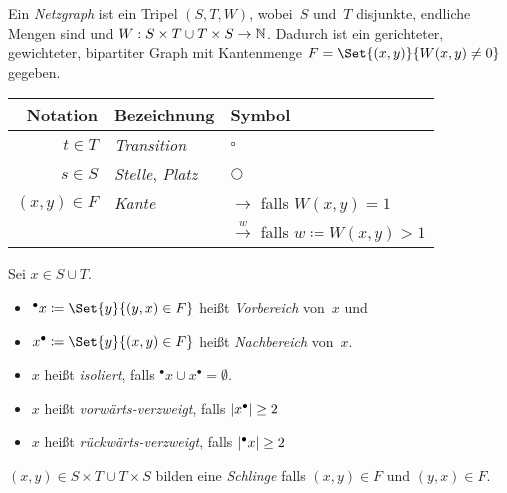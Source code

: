 \documentclass{cheat-sheet}
\newcommand{\transition}{\square} %
\newcommand{\place}{\bigcirc} %
\newcommand{\preset}[1]{{}^\bullet{#1}} %
\newcommand{\postset}[1]{{#1}^\bullet} %
\begin{document}
\raggedcolumns %



\begin{defn}
  Ein \emph{Netzgraph} ist ein Tripel $(S, T, W)$, wobei~$S$ und~$T$ disjunkte, endliche Mengen sind und $W : S \times T \cup T \times S \to \mathbb{N}$.
  Dadurch ist ein gerichteter, gewichteter, bipartiter Graph mit Kantenmenge $F = \Set{(x, y)}{W(x, y) \neq 0}$ gegeben.
\end{defn}

\begin{center}
  \begin{tabular}{r l l}
    Notation & Bezeichnung & Symbol \\ \hline
    $t \in T$ & \emph{Transition} & $\transition$ \\
    $s \in S$ & \emph{Stelle}, \emph{Platz} & $\place$ \\
    $(x, y) \in F$ & \emph{Kante} & $\xrightarrow{\enspace}$ falls $W(x, y) = 1$ \\
    && $\xrightarrow{w}$ falls $w \coloneqq W(x, y) > 1$
  \end{tabular}
\end{center}

\begin{defn}
  Sei $x \in S \cup T$.
  \begin{itemize}
    \item $\preset{x} \coloneqq \Set{y}{(y, x) \in F}$ heißt \emph{Vorbereich} von~$x$ und
    \item $\postset{x} \coloneqq \Set{y}{(x, y) \in F}$ heißt \emph{Nachbereich} von~$x$.
    \item $x$ heißt \emph{isoliert}, falls $\preset{x} \cup \postset{x} = \emptyset$.
    \item $x$ heißt \emph{vorwärts-verzweigt}, falls $\card{\postset{x}} \geq 2$ 
    \item $x$ heißt \emph{rückwärts-verzweigt}, falls $\card{\preset{x}} \geq 2$ 
  \end{itemize}
\end{defn}

\begin{defn}
  $(x, y) \in S \times T \cup T \times S$ bilden eine \emph{Schlinge} falls $(x, y) \in F$ und $(y, x) \in F$.
\end{defn}
\end{document}
